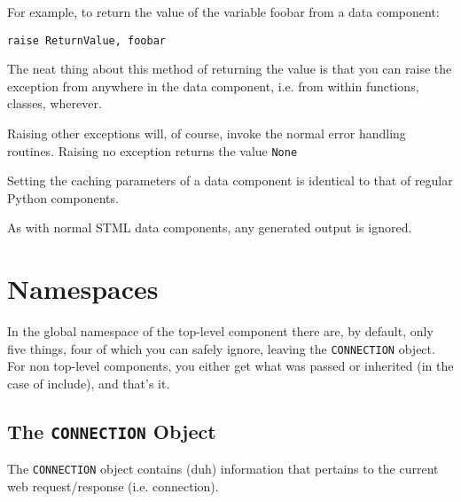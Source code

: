 \documentclass{manual}
\begin{document}
For example, to return the value of the variable foobar from a data
component:
\begin{verbatim}
raise ReturnValue, foobar
\end{verbatim}


The neat thing about this method of returning the value is that you
can raise the exception from anywhere in the data component, i.e. from
within functions, classes, wherever.

Raising other exceptions will, of course, invoke the normal error
handling routines.  Raising no exception returns the value \texttt{None}

Setting the caching parameters of a data component is identical to that of
regular Python components.

As with normal STML data components, any generated output is ignored.



\chapter{Namespaces}
\label{namespaces}

In the global namespace of the top-level component there are, by
default, only five things, four of which you can safely ignore,
leaving the \texttt{CONNECTION} object.  For non top-level components,
you either get what was passed or inherited (in the case of include),
and that's it.


\section{The \texttt{CONNECTION} Object}
\label{connectionobj}

The \texttt{CONNECTION} object contains (duh) information that
pertains to the current web request/response (i.e. connection).
\end{document}
